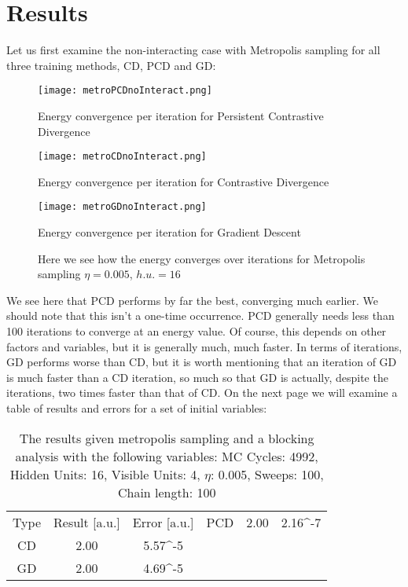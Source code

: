 \documentclass{article}
\begin{document}
\section{Results}
Let us first examine the non-interacting case with Metropolis sampling for all three training methods, CD, PCD and GD:
\begin{figure}[htbp]
  \centering
  \begin{minipage}[b]{0.3\textwidth}
    \texttt{[image: metroPCDnoInteract.png]}
    \caption{Energy convergence per iteration for Persistent Contrastive Divergence}
    \label{fig:figure1a}
  \end{minipage}
  \hfill
  \begin{minipage}[b]{0.3\textwidth}
    \texttt{[image: metroCDnoInteract.png]}
    \caption{Energy convergence per iteration for Contrastive Divergence}
    \label{fig:figure1b}
  \end{minipage}
  \hfill
  \begin{minipage}[b]{0.3\textwidth}
    \texttt{[image: metroGDnoInteract.png]}
    \caption{Energy convergence per iteration for Gradient Descent}
    \label{fig:figure1c}
  \end{minipage}
  \caption*{Here we see how the energy converges over iterations for Metropolis sampling\newline
    $\eta = 0.005$, $h.u. = 16$}
\end{figure}
\newline
We see here that PCD performs by far the best, converging much earlier. We should note that this isn't a one-time occurrence. PCD generally needs less than 100 iterations to converge at an energy value. Of course, this depends on other factors and variables, but it is generally much, much faster. In terms of iterations, GD performs worse than CD, but it is worth mentioning that an iteration of GD is much faster than a CD iteration, so much so that GD is actually, despite the iterations, two times faster than that of CD. \newline
On the next page we will examine a table of results and errors for a set of initial variables:
\newpage
\begin{table}[ht!]
    \centering
    \begin{tabular}{c|c|c}
     Type& Result [a.u.]& Error [a.u.]&
     \hline
     PCD&  2.00& 2.16^{-7}\\
     CD& 2.00& 5.57^{-5}\\
     GD& 2.00& 4.69^{-5}
    \end{tabular}
    \caption{The results given metropolis sampling and a blocking analysis with the following variables:
    \newline MC Cycles: 4992, Hidden Units: 16, Visible Units: 4, $\eta$: 0.005, Sweeps: 100, Chain length: 100
    }
    \label{tab:metro}
\end{table}
\end{document}
